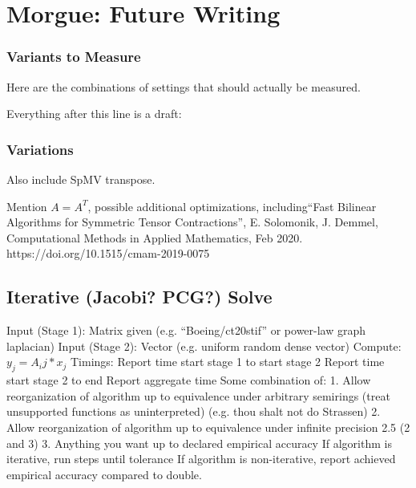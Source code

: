 

\section{Morgue: Future Writing}

\subsubsection{Variants to Measure}
Here are the combinations of settings that should actually be measured.


Everything after this line is a draft:



\subsubsection{Variations}
    Also include SpMV transpose.

    Mention $A=A^T$, possible additional optimizations,
    including``Fast Bilinear Algorithms for Symmetric Tensor 
    Contractions'', E. Solomonik, J. Demmel, Computational Methods
    in Applied Mathematics, Feb 2020.
    \newline
    https://doi.org/10.1515/cmam-2019-0075



\subsection{Iterative (Jacobi? PCG?) Solve}
	Input (Stage 1):
		Matrix given (e.g. “Boeing/ct20stif” or power-law graph laplacian)
	Input (Stage 2):
		Vector (e.g. uniform random dense vector)
	Compute:
		$y_j = A_ij * x_j$
	Timings:
Report time start stage 1 to start stage 2
Report time start stage 2 to end
Report aggregate time
Some combination of:
1. Allow reorganization of algorithm up to equivalence under arbitrary semirings (treat unsupported functions as uninterpreted) (e.g. thou shalt not do Strassen)
2. Allow reorganization of algorithm up to equivalence under infinite precision
2.5 (2 and 3)
3. Anything you want up to declared empirical accuracy
If algorithm is iterative, run steps until tolerance
If algorithm is non-iterative, report achieved empirical accuracy compared to double.

